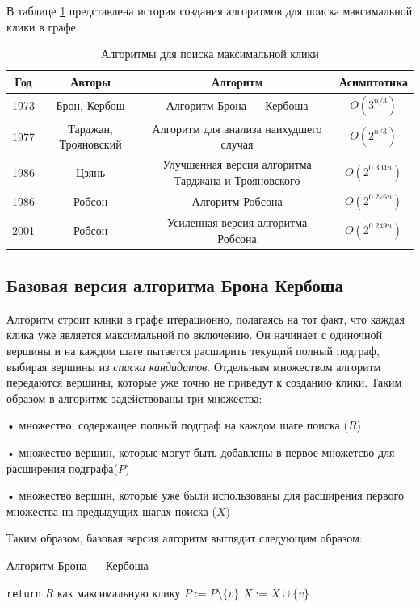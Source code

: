 \documentclass{article}
\begin{document}
В таблице \ref{tab:clique_algorithms} представлена история создания алгоритмов для поиска максимальной клики в графе.
\begin{table}[h!]
\centering
\begin{tabular}{|c|c|c|c|}
\hline
\textbf{Год} & \textbf{Авторы} & \textbf{Алгоритм} & \textbf{Асимптотика} \\ \hline
1973 & Брон, Кербош & Алгоритм Брона — Кербоша & \( O(3^{n/3}) \) \\ \hline
1977 & Тарджан, Трояновский & Алгоритм для анализа наихудшего случая & \( O(2^{n/3}) \) \\ \hline
1986 & Цзянь & Улучшенная версия алгоритма Тарджана и Трояновского & \( O(2^{0.304n}) \) \\ \hline
1986 & Робсон & Алгоритм Робсона & \( O(2^{0.276n}) \) \\ \hline
2001 & Робсон & Усиленная версия алгоритма Робсона & \( O(2^{0.249n}) \) \\ \hline
\end{tabular}
\caption{Алгоритмы для поиска максимальной клики}
\label{tab:clique_algorithms}
\end{table}

\subsection{Базовая версия алгоритма Брона Кербоша}
Алгоритм строит клики в графе итерационно, полагаясь на тот факт, что каждая клика уже является максимальной по включению. Он начинает с одиночной вершины и на каждом шаге пытается расширить текущий полный подграф, выбирая вершины из \textit{списка кандидатов}. Отдельным множеством алгоритм передаются вершины, которые уже точно не приведут к созданию клики. Таким образом в алгоритме задействованы три множества:

• множество, содержащее полный подграф на каждом шаге поиска ($R$)

• множество вершин, которые могут быть добавлены в первое множетсво для расширения подграфа($P$)

• множество вершин, которые уже были использованы для расширения первого множества на предыдущих шагах поиска ($X$)

Таким образом, базовая версия алгоритм  выглядит следующим образом:

\begin{algorithm}
\caption{Алгоритм Брона — Кербоша}
\begin{algorithmic}[1]
        \State \texttt{return} $R$ как максимальную клику
    \EndIf
        \State {}
        \State $P := P \setminus \{v\}$
        \State $X := X \cup \{v\}$
    \EndFor
\EndProcedure
\end{algorithmic}
\end{algorithm}
\end{document}

